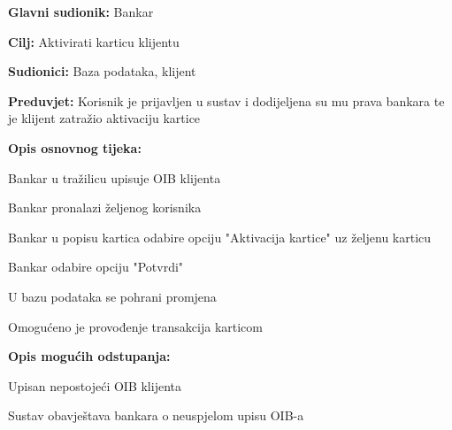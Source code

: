             
            	\noindent {}
            	\begin{packed_item}
            		
            		\item \textbf{Glavni sudionik: }Bankar
            		\item  \textbf{Cilj:} Aktivirati karticu klijentu
            		\item  \textbf{Sudionici:} Baza podataka, klijent
            		\item  \textbf{Preduvjet:} Korisnik je prijavljen u sustav i dodijeljena su mu prava bankara te je klijent zatražio aktivaciju kartice
            		\item  \textbf{Opis osnovnog tijeka:}
            		
            		\item[] \begin{packed_enum}
            			
            			\item Bankar u tražilicu upisuje OIB klijenta
            			\item Bankar pronalazi željenog korisnika
            			\item Bankar u popisu kartica odabire opciju "Aktivacija kartice" uz željenu karticu
            			\item Bankar odabire opciju "Potvrdi"
            			\item U bazu podataka se pohrani promjena 
            			\item Omogućeno je provođenje transakcija karticom
            		\end{packed_enum}
            		
            		\item  \textbf{Opis mogućih odstupanja:} 
            		
            		\item[] \begin{packed_item}
            			
            			\item[1.a] Upisan nepostojeći OIB klijenta
            			\item[] \begin{packed_enum}
            				
            				\item Sustav obavještava bankara o neuspjelom upisu OIB-a
            				
            			\end{packed_enum}
            			
            		\end{packed_item}
            	\end{packed_item}
                
